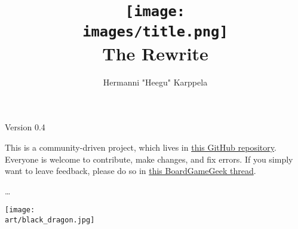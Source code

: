 \documentclass[12pt]{article}
\def\_assets{assets}
\def\art{\_assets/art}
\def\images{\_assets/images}
\def\layout{\_assets/layout}
\begin{document}
\begin{titlepage}
\end{titlepage}

\title{\texttt{[image: \\images/title.png]}\\The Rewrite}

\author{Hermanni "Heegu" Karppela}
\maketitle

\begin{center}
Version 0.4
\end{center}

\bigbreak

This is a community-driven project, which lives in \href{https://github.com/Heegu-sama/Homm3BG}{this GitHub repository}.
Everyone is welcome to contribute, make changes, and fix errors.
If you simply want to leave feedback, please do so in \href{https://boardgamegeek.com/thread/3235221/rule-book-rewrite-project}{this BoardGameGeek thread}.

\bigbreak
\ldots

\clearpage

\begin{multicols*}{2}
\tableofcontents
\vspace*{\fill}
\columnbreak
\vspace*{\fill}
\texttt{[image: \\art/black\_dragon.jpg]}
\end{multicols*}

\clearpage






\end{document}
